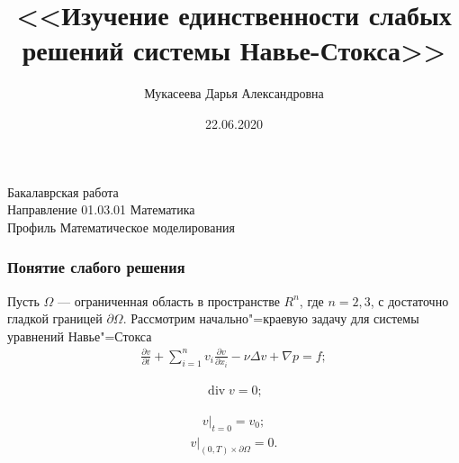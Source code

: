 \documentclass[10pt, pdf, hyperref={unicode}]{beamer}
\title{<<Изучение единственности слабых решений системы Навье-Стокса>>}
\date{22.06.2020}
\author{Мукасеева Дарья Александровна}
\begin{document}
  \begin{frame} %
    \titlepage
    \begin{center}
      Бакалаврская работа\\
      Направление 01.03.01 Математика\\
      Профиль Математическое моделирования
    \end{center}
  \end{frame}


  \begin{frame}
    \frametitle{Понятие слабого решения}
    \begin{center}
      \begin{minipage}[h]{0.97\linewidth}
        Пусть $\Omega$ --- ограниченная область в пространстве $R^n$, где $n=2, 3$,
        с достаточно гладкой границей $\partial\Omega$.
        Рассмотрим начально"=краевую задачу для системы уравнений Навье"=Стокса
        \begin{equation}\label{eq:5.1}
          \begin{gathered}
            \frac{\partial v}{\partial t}+\sum_{i=1}^nv_i\frac{\partial v}
            {\partial x_i}-\nu\Delta v+\nabla p=f;
          \end{gathered}
        \end{equation}

        \begin{equation}\label{eq:5.2}
          \begin{gathered}
            \operatorname{div} v=0;
          \end{gathered}
        \end{equation}

        \begin{equation}\label{eq:5.3}
          \begin{gathered}
            v|_{t=0}=v_0;
          \end{gathered}
        \end{equation}
        \begin{equation}\label{eq:5.4}
          \begin{gathered}
            v|_{(0, T)\times\partial\Omega}=0.
          \end{gathered}
        \end{equation}
      \end{minipage}
    \end{center}
  \end{frame}
\end{document}
